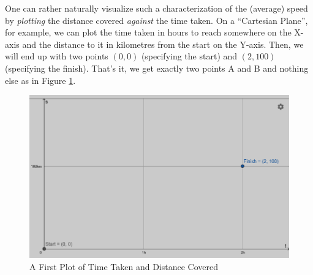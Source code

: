 \documentclass[12pt,a4paper]{book}
\begin{document}
\begin{enumerate}
\begin{enumerate}
                One can rather naturally visualize such a characterization of the (average) speed by \emph{plotting} the distance covered \emph{against} the time taken. On a ``Cartesian Plane'', for example, we can plot the time taken in hours to reach somewhere on the X-axis and the distance to it in kilometres from the start on the Y-axis. Then, we will end up with two points $(0, 0)$ (specifying the start) and $(2, 100)$ (specifying the finish). That's it, we get exactly two points A and B and nothing else as in Figure \ref{fig: a-first-s-t-plot}.
                        \begin{figure}[h!]
                            \centering
                            \includegraphics[width=0.5\linewidth]{a-first-s-t-plot.png}
                            \caption{A First Plot of Time Taken and Distance Covered}
                            \label{fig: a-first-s-t-plot}
                        \end{figure}


\end{enumerate}
\end{enumerate}
\end{document}
